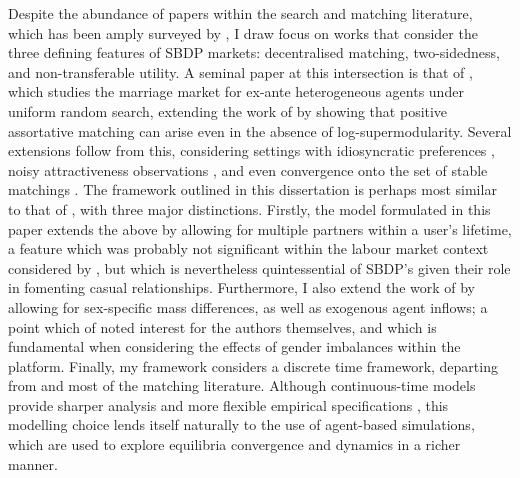 Despite the abundance of papers within the search and matching literature, which has been amply surveyed by \cite{chade2017sorting}, I draw focus on works that consider the three defining features of SBDP markets: decentralised matching, two-sidedness, and non-transferable utility. 
A seminal paper at this intersection is that of \cite{burdett1997marriage}, which studies the marriage market for ex-ante heterogeneous agents under uniform random search, extending the work of \cite{becker1973theory} by showing that positive assortative matching can arise even in the absence of log-supermodularity.
Several extensions follow from this, considering settings with idiosyncratic preferences \citep{burdett1998two}, noisy attractiveness observations \citep{chade2006matching}, and even convergence onto the set of stable matchings \citep{adachi2003search}. 
The framework outlined in this dissertation is perhaps most similar to that of \cite{burdett1998two}, with three major distinctions. 
Firstly, the model formulated in this paper extends the above by allowing for multiple partners within a user's lifetime, a feature which was probably not significant within the labour market context considered by \cite{burdett1998two}, but which is nevertheless quintessential of SBDP's given their role in fomenting casual relationships.
Furthermore, I also extend the work of \citeauthor{burdett1998two} by allowing for sex-specific mass differences, as well as exogenous agent inflows; a point which of noted interest for the authors themselves, and which is fundamental when considering the effects of gender imbalances within the platform. 
Finally, my framework considers a discrete time framework, departing from \cite{burdett1998two} and most of the matching literature. 
Although continuous-time models provide sharper analysis and more flexible empirical specifications \citep{burdett1999long}, this modelling choice lends itself naturally to the use of agent-based simulations, which are used to explore equilibria convergence and dynamics in a richer manner. 

